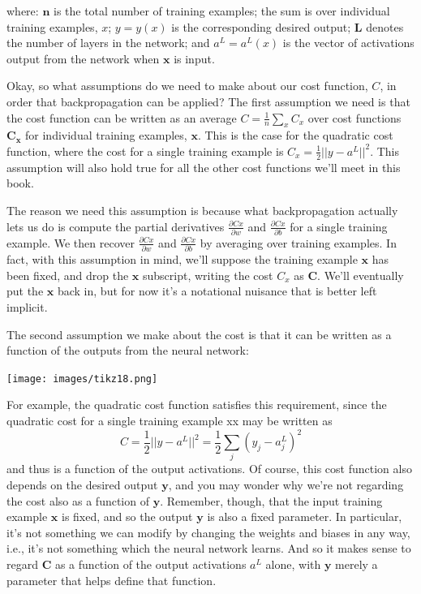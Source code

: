 \documentclass[a4paper,12pt]{report}%
\begin{document}
where: $\mathbf{n}$ is the total number of training examples; the sum is over individual training examples, $x$; $y=y(x)$ is the corresponding desired output; $\mathbf{L}$ denotes the number of layers in the network; and $a^{L}=a^{L}(x)$ is the vector of activations output from the network when $\mathbf{x}$ is input.

Okay, so what assumptions do we need to make about our cost function, $C$, in order that backpropagation can be applied? The first assumption we need is that the cost function can be written as an average $C = \frac{1}{n} \sum_{x} C_{x}$ over cost functions $\mathbf{C_{x}}$ for individual training examples, $\mathbf{x}$. This is the case for the quadratic cost function, where the cost for a single training example is $C_{x}=\frac{1}{2} || y−a^{L} ||^{2}$. This assumption will also hold true for all the other cost functions we'll meet in this book.

The reason we need this assumption is because what backpropagation actually lets us do is compute the partial derivatives $\frac{∂Cx}{∂w}$ and $\frac{∂Cx}{∂b}$ for a single training example. We then recover $\frac{∂Cx}{∂w}$ and $\frac{∂Cx}{∂b}$ by averaging over training examples. In fact, with this assumption in mind, we'll suppose the training example $\mathbf{x}$ has been fixed, and drop the $\mathbf{x}$ subscript, writing the cost $C_{x}$ as $\mathbf{C}$. We'll eventually put the $\mathbf{x}$ back in, but for now it's a notational nuisance that is better left implicit.

The second assumption we make about the cost is that it can be written as a function of the outputs from the neural network:
\begin{center}
 \texttt{[image: images/tikz18.png]}
\end{center}

For example, the quadratic cost function satisfies this requirement, since the quadratic cost for a single training example xx may be written as
\begin{equation}
 C = \frac{1}{2} || y−a^{L} ||^{2}  = \frac{1}{2} \sum_{j}(y_{j} − a^{L}_{j})^{2}
\end{equation}
and thus is a function of the output activations. Of course, this cost function also depends on the desired output $\mathbf{y}$, and you may wonder why we're not regarding the cost also as a function of $\mathbf{y}$. Remember, though, that the input training example $\mathbf{x}$ is fixed, and so the output $\mathbf{y}$ is also a fixed parameter. In particular, it's not something we can modify by changing the weights and biases in any way, i.e., it's not something which the neural network learns. And so it makes sense to regard $\mathbf{C}$ as a function of the output activations $a^{L}$ alone, with $\mathbf{y}$ merely a parameter that helps define that function.
\end{document}
